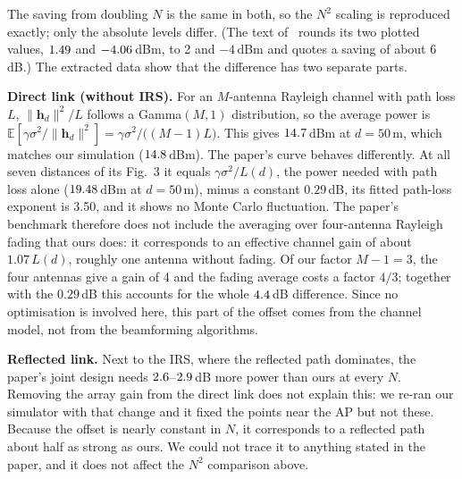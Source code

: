 \documentclass[11pt,a4paper]{article}
\newcommand{\hdv}{\bm{h}_d}
\begin{document}
The saving from doubling $N$ is the same in both, so the $N^2$ scaling is reproduced exactly; only
the absolute levels differ. (The text of~\cite{wu} rounds its two plotted values, $1.49$ and
$-4.06$\,dBm, to 2 and $-4$\,dBm and quotes a saving of about 6\,dB.) The extracted data show that the difference has two separate parts.

\textbf{Direct link (without IRS).} For an $M$-antenna Rayleigh channel with path loss $L$,
$\|\hdv\|^2/L$ follows a Gamma$(M,1)$ distribution, so the average power is
$\mathbb{E}[\gamma\sigma^2/\|\hdv\|^2]=\gamma\sigma^2/\big((M-1)L\big)$. This gives $14.7$\,dBm at
$d=50$\,m, which matches our simulation ($14.8$\,dBm). The paper's curve behaves differently.
At all seven distances of its Fig.~3 it equals $\gamma\sigma^2/L(d)$, the power needed with path loss
alone ($19.48$\,dBm at $d=50$\,m), minus a constant $0.29$\,dB, its fitted path-loss exponent is
3.50, and it shows no Monte Carlo fluctuation. The paper's benchmark therefore does not include the
averaging over four-antenna Rayleigh fading that ours does: it corresponds to an effective channel
gain of about $1.07\,L(d)$, roughly one antenna without fading. Of our factor $M-1=3$, the four
antennas give a gain of 4 and the fading average costs a factor $4/3$; together with the $0.29$\,dB
this accounts for the whole $4.4$\,dB difference. Since no optimisation is involved here, this
part of the offset comes from the channel model, not from the beamforming algorithms.

\textbf{Reflected link.} Next to the IRS, where the reflected path dominates, the paper's joint design
needs $2.6$--$2.9$\,dB more power than ours at every $N$. Removing the array gain from
the direct link does not explain this: we re-ran our simulator with that change and it fixed the
points near the AP but not these. Because the offset is nearly constant in $N$, it corresponds to a
reflected path about half as strong as ours. We could not trace it to anything stated in the paper,
and it does not affect the $N^2$ comparison above.
\end{document}
